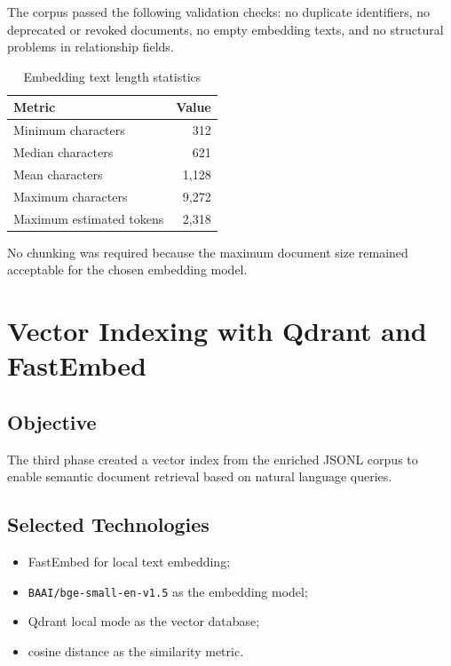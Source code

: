 \documentclass[12pt,a4paper]{report}
\begin{document}
The corpus passed the following validation checks: no duplicate identifiers, no deprecated or revoked documents, no empty embedding texts, and no structural problems in relationship fields.

\begin{table}[H]
\centering
\begin{tabular}{lr}
\toprule
\textbf{Metric} & \textbf{Value} \\
\midrule
Minimum characters & 312 \\
Median characters & 621 \\
Mean characters & 1,128 \\
Maximum characters & 9,272 \\
Maximum estimated tokens & 2,318 \\
\bottomrule
\end{tabular}
\caption{Embedding text length statistics}
\end{table}

No chunking was required because the maximum document size remained acceptable for the chosen embedding model.


\chapter{Vector Indexing with Qdrant and FastEmbed}

\section{Objective}

The third phase created a vector index from the enriched JSONL corpus to enable semantic document retrieval based on natural language queries.

\section{Selected Technologies}

\begin{itemize}
    \item FastEmbed for local text embedding;
    \item \texttt{BAAI/bge-small-en-v1.5} as the embedding model;
    \item Qdrant local mode as the vector database;
    \item cosine distance as the similarity metric.
\end{itemize}
\end{document}
